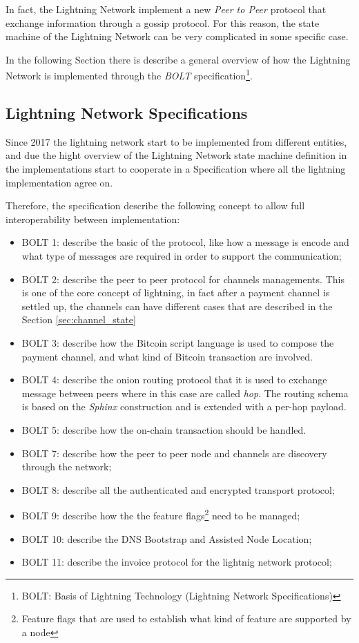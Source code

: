 In fact, the Lightning Network implement a new \emph{Peer to Peer} protocol that exchange information through
a gossip protocol. For this reason, the state machine of the Lightning Network
can be very complicated in some specific case.

In the following Section there is describe a general overview of how the Lightning Network is implemented through the
\emph{BOLT} specification\footnote{BOLT: Basis of Lightning Technology (Lightning Network Specifications)}.

\subsection{Lightning Network Specifications}

Since 2017 the lightning network start to be implemented from different entities,
and due the hight overview of the Lightning Network state machine definition in \cite{lightning-network-paper}
the implementations start to cooperate in a Specification where all the lightning implementation agree on.

Therefore, the specification describe the following concept to allow full interoperability between implementation:

\begin{itemize}
  \item BOLT 1: describe the basic of the protocol, like how a message is encode and what type of messages are required in order to support the communication;
  \item BOLT 2: describe the peer to peer protocol for channels managements. This is one of the core concept of lightning, in fact after a payment channel
        is settled up, the channels can have different cases that are described in the Section \ref{sec:channel_state}
  \item BOLT 3: describe how the Bitcoin script language is used to compose the
        payment channel, and what kind of Bitcoin transaction are involved.
  \item BOLT 4: describe the onion routing protocol that it is used to exchange message between peers where in this case are called \emph{hop}.
        The routing schema is based on the \emph{Sphinx}\cite{sphinx} construction and is extended with a per-hop payload.
  \item BOLT 5: describe how the on-chain transaction should be handled.
  \item BOLT 7: describe how the peer to peer node and channels are discovery through the network;
  \item BOLT 8: describe all the authenticated and encrypted transport protocol;
  \item BOLT 9: describe how the the feature flags\footnote{Feature flags that are used to establish what kind of feature are supported by a node} need to be managed;
  \item BOLT 10: describe the DNS Bootstrap and Assisted Node Location;
  \item BOLT 11: describe the invoice protocol for the lightnig network protocol;
\end{itemize}

